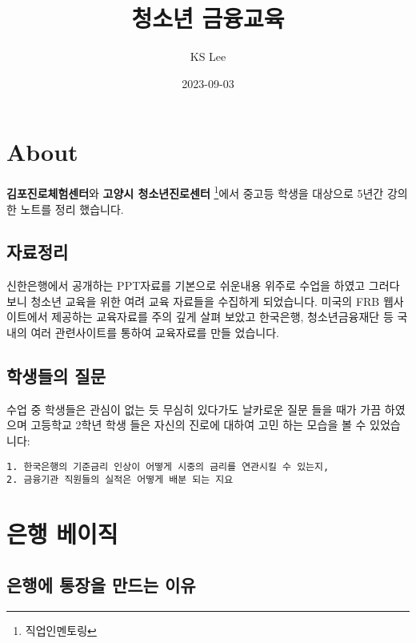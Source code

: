 \documentclass[
]{book}
\title{청소년 금융교육}
\author{KS Lee}
\date{2023-09-03}
\begin{document}
\maketitle

{
\setcounter{tocdepth}{1}
\tableofcontents
}
\hypertarget{about}{%
\chapter{About}\label{about}}

\textbf{김포진로체험센터}와 \textbf{고양시 청소년진로센터 }\footnote{직업인멘토링}에서 중고등 학생을 대상으로 5년간 강의한 노트를 정리 했습니다.

\hypertarget{uxc790uxb8ccuxc815uxb9ac}{%
\section{자료정리}\label{uxc790uxb8ccuxc815uxb9ac}}

신한은행에서 공개하는 PPT자료를 기본으로 쉬운내용 위주로 수업을 하였고 그러다 보니 청소년 교육을 위한 여려 교육 자료들을 수집하게 되었습니다. 미국의 FRB 웹사이트에서 제공하는 교육자료를 주의 깊게 살펴 보았고 한국은행, 청소년금융재단 등 국내의 여러 관련사이트를 통하여 교육자료를 만들 었습니다.

\hypertarget{uxd559uxc0dduxb4e4uxc758-uxc9c8uxbb38}{%
\section{학생들의 질문}\label{uxd559uxc0dduxb4e4uxc758-uxc9c8uxbb38}}

수업 중 학생들은 관심이 없는 듯 무심히 있다가도 날카로운 질문 들을 때가 가끔 하였으며 고등학교 2학년 학생 들은 자신의 진로에 대하여 고민 하는 모습을 볼 수 있었습니다:

\begin{verbatim}
1. 한국은행의 기준금리 인상이 어떻게 시중의 금리를 연관시킬 수 있는지,
2. 금융기관 직원들의 실적은 어떻게 배분 되는 지요   
\end{verbatim}

\hypertarget{uxc740uxd589-uxbca0uxc774uxc9c1}{%
\chapter{은행 베이직}\label{uxc740uxd589-uxbca0uxc774uxc9c1}}

\hypertarget{uxc740uxd589uxc5d0-uxd1b5uxc7a5uxc744-uxb9ccuxb4dcuxb294-uxc774uxc720}{%
\section{은행에 통장을 만드는 이유}\label{uxc740uxd589uxc5d0-uxd1b5uxc7a5uxc744-uxb9ccuxb4dcuxb294-uxc774uxc720}}
\end{document}
